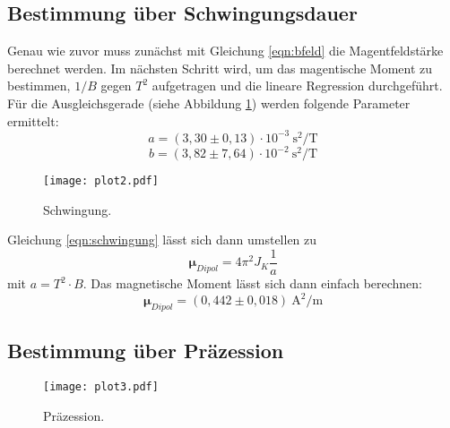 \subsection{Bestimmung über Schwingungsdauer}

Genau wie zuvor muss zunächst mit Gleichung \eqref{eqn:bfeld} die Magentfeldstärke berechnet werden.
Im nächsten Schritt wird, um das magentische Moment zu bestimmen, $1/B$ gegen $T^{2}$ aufgetragen und die lineare Regression durchgeführt.
Für die Ausgleichsgerade (siehe Abbildung \ref{fig:plot2}) werden folgende Parameter ermittelt:
\begin{equation*}
  a = (3,30 \pm 0,13) \cdot 10^{-3} \: \text{s}^{2}/\text{T}
\end{equation*}
\begin{equation*}
  b = (3,82 \pm 7,64) \cdot 10^{-2} \: \text{s}^{2}/\text{T}
\end{equation*}
\begin{figure}
  \centering
  \texttt{[image: plot2.pdf]}
  \caption{Schwingung.}
  \label{fig:plot2}
\end{figure}
Gleichung \eqref{eqn:schwingung} lässt sich dann umstellen zu
\begin{equation}
  \symbf{\mu}_{Dipol} = 4 \pi^2 J_K \frac{1}{a}
\end{equation}
mit $a = T^{2} \cdot B$.
Das magnetische Moment lässt sich dann einfach berechnen:
\begin{equation*}
  \symbf{\mu}_{Dipol} = (0,442 \pm 0,018) \: \text{A}^{2}/\text{m}
\end{equation*}

\subsection{Bestimmung über Präzession}

\begin{figure}
  \centering
  \texttt{[image: plot3.pdf]}
  \caption{Präzession.}
  \label{fig:plot3}
\end{figure}
